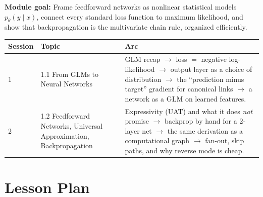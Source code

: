 \documentclass[11pt]{article}
\begin{document}
\textbf{Module goal:} Frame feedforward networks as nonlinear statistical models $p_\theta(y \mid x)$, connect every standard loss function to maximum likelihood, and show that backpropagation is the multivariate chain rule, organized efficiently.

\begin{longtable}{@{}p{1.6cm}p{5.6cm}p{8.2cm}@{}}
\toprule
\textbf{Session} & \textbf{Topic} & \textbf{Arc} \\
\midrule
\endhead
1 & 1.1 From GLMs to Neural Networks & GLM recap $\to$ loss $=$ negative log-likelihood $\to$ output layer as a choice of distribution $\to$ the ``prediction minus target'' gradient for canonical links $\to$ a network as a GLM on learned features. \\
2 & 1.2 Feedforward Networks, Universal Approximation, Backpropagation & Expressivity (UAT) and what it does \emph{not} promise $\to$ backprop by hand for a 2-layer net $\to$ the same derivation as a computational graph $\to$ fan-out, skip paths, and why reverse mode is cheap. \\
\bottomrule
\end{longtable}

\section{Lesson Plan}\label{sec:plan}
\end{document}
